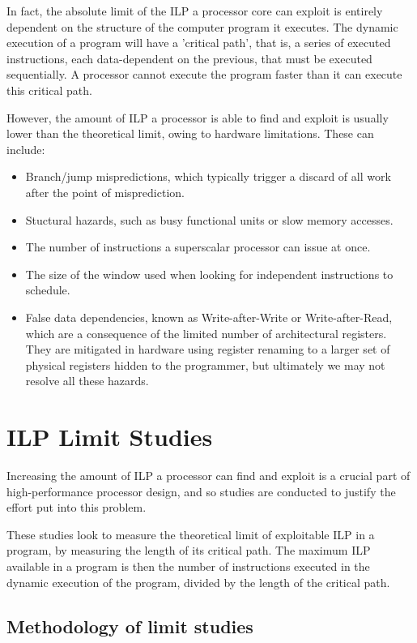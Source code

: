 In fact, the absolute limit of the ILP a processor core can exploit is entirely dependent on the structure of 
the computer program it executes. The dynamic execution of a program will have a 'critical path', that is, a series of 
executed instructions, each data-dependent on the previous, that must be executed sequentially. A processor cannot execute 
the program faster than it can execute this critical path.

However, the amount of ILP a processor is able to find and exploit is usually lower than the theoretical limit, owing to 
hardware limitations. These can include:

\begin{itemize}
  \item Branch/jump mispredictions, which typically trigger a discard of all work after the point of misprediction.
  \item Stuctural hazards, such as busy functional units or slow memory accesses.
  \item The number of instructions a superscalar processor can issue at once.
  \item The size of the window used when looking for independent instructions to schedule.
  \item False data dependencies, known as Write-after-Write or Write-after-Read, which are a consequence of the limited 
    number of architectural registers. They are mitigated in hardware using register renaming to a larger set of physical
    registers hidden to the programmer, but ultimately we may not resolve all these hazards.
\end{itemize}

\section{ILP Limit Studies}


Increasing the amount of ILP a processor can find and exploit is a crucial part of high-performance processor design,
and so studies are conducted to justify the effort put into this problem.

These studies look to measure the theoretical limit of exploitable ILP in a program, by measuring the length of its 
critical path. The maximum ILP available in a program is then the number of instructions executed in the dynamic 
execution of the program, divided by the length of the critical path.

\subsection{Methodology of limit studies}

